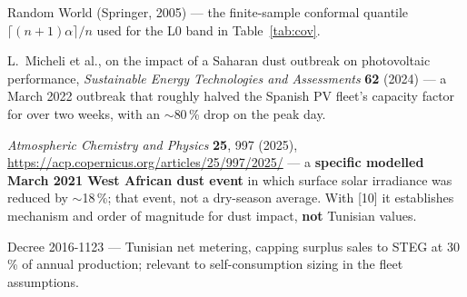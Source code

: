 \documentclass[11pt,a4paper]{article}
\begin{document}
\begin{enumerate}[label={[\arabic*]}]
{Random World} (Springer, 2005) --- the finite-sample conformal quantile
$\lceil (n{+}1)\alpha\rceil/n$ used for the L0 band in Table~\ref{tab:cov}.
\item L.\ Micheli et al., on the impact of a Saharan dust outbreak on
photovoltaic performance, \emph{Sustainable Energy Technologies and Assessments}
\textbf{62} (2024) --- a March 2022 outbreak that roughly halved the Spanish PV
fleet's capacity factor for over two weeks, with an $\sim$80\,\% drop on the peak
day.
\item \emph{Atmospheric Chemistry and Physics} \textbf{25}, 997 (2025),
\url{https://acp.copernicus.org/articles/25/997/2025/} --- a \textbf{specific
modelled March 2021 West African dust event} in which surface solar irradiance
was reduced by $\sim$18\,\%; that event, not a dry-season average. With [10] it
establishes mechanism and order of magnitude for dust impact, \textbf{not}
Tunisian values.
\item Decree 2016-1123 --- Tunisian net metering, capping surplus sales to STEG
at 30\,\% of annual production; relevant to self-consumption sizing in the fleet
assumptions.
\end{enumerate}
\end{document}
